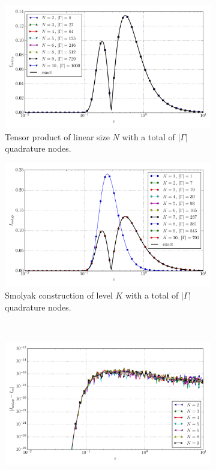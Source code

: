 \documentclass[a4paper,10pt]{article}
\begin{document}
\begin{figure}[ht!]
  \begin{subfigure}[t]{0.5\linewidth}
    \includegraphics[width=\linewidth]{./plots/tp_sg_3d_conv_eps_(1,1,0)_(0,1,1)_val_nsd_tp.pdf}
    \caption{Tensor product of linear size $N$ with a total of $|\Gamma|$ quadrature nodes.}
    \label{fig:tp_sg_3d_conv_eps_110_011_val_nsd_tp}
  \end{subfigure}
  \begin{subfigure}[t]{0.5\linewidth}
    \includegraphics[width=\linewidth]{./plots/tp_sg_3d_conv_eps_(1,1,0)_(0,1,1)_val_nsd_gk.pdf}
    \caption{Smolyak construction of level $K$ with a total of $|\Gamma|$ quadrature nodes.}
    \label{fig:tp_sg_3d_conv_eps_110_011_val_nsd_gk}
  \end{subfigure} \\
  \begin{subfigure}[t]{0.5\linewidth}
    \includegraphics[width=\linewidth]{./plots/tp_sg_3d_conv_eps_(1,1,0)_(0,1,1)_err_nsd_tp.pdf}

\end{subfigure}
\end{figure}
\end{document}

